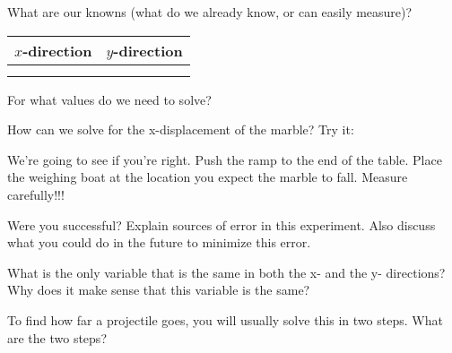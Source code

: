 \documentclass[10pt]{exam}
\begin{document}
\begin{questions}
  \question
    What are our knowns (what do we already know, or can easily measure)?

    \begin{center}
      \begin{tabular}{c|c}
        $x$-direction & $y$-direction \\
        \hline \\
        \\[3em]
      \end{tabular}
    \end{center}
  
  \question
    For what values do we need to solve?
    \vspace{3em}
  
  \question
    How can we solve for the x-displacement of the marble?  Try it:

  \pagebreak
  
  \question
    We're going to see if you're right.  Push the ramp to the end of the table.  Place the weighing boat at the location you expect the marble to fall.  Measure carefully!!!
  
  \question
    Were you successful?  Explain sources of error in this experiment.  Also discuss what you could do in the future to minimize this error.
    \vs
  
  
  \question
    What is the only variable that is the same in both the x- and the y- directions?  Why does it make sense that this variable is the same?
    \vs
  
  \question
    To find how far a projectile goes, you will usually solve this in two steps.  What are the two steps?
    \vs
\end{questions}
\end{document}
